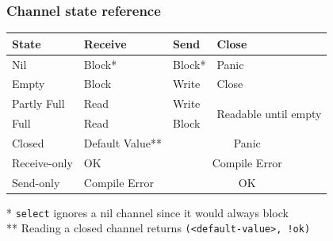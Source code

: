 \documentclass[handout,compress,t,11pt]{beamer}
\begin{document}
\begin{frame}[fragile]
\frametitle{Channel state reference}
{\renewcommand{\arraystretch}{1.5}
\begin{table}[h!]
  \begin{center}
    \begin{tabular}{l||l|l|l}%
      \textbf{State} & \textbf{Receive}  & \textbf{Send} & \textbf{Close}\\
      \hline\hline
      Nil & Block* & Block* & Panic \\
      \hline
      Empty & Block & Write & Close \\
      \hline
      Partly Full & Read & Write & \multirow{2}{*}{Readable until empty} \\
      \cline{1-3}
      Full & Read & Block \\
      \hline
      Closed & Default Value** & \multicolumn{2}{c}{Panic} \\
      \hline\hline
      Receive-only & OK & \multicolumn{2}{c}{Compile Error} \\
      \hline
      Send-only & Compile Error & \multicolumn{2}{c}{OK} \\
    \end{tabular}
  \end{center}
\end{table}
}
{\footnotesize
  * \verb|select| ignores a nil channel since it would always block \\
  ** Reading a closed channel returns \verb|(<default-value>, !ok)|
}
\end{frame}




\end{document}
